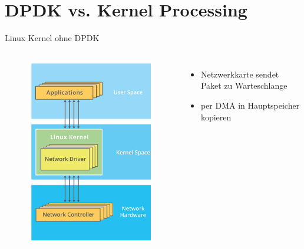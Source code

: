 \documentclass{beamer}
\begin{document}
\section{DPDK vs. Kernel Processing}
\begin{frame}{Linux Kernel ohne DPDK}
    \begin{columns}
        \begin{figure}[h]
            \centering
            \includegraphics[width=\linewidth]{img/kernel_without_dpdk.png}
        \end{figure}
        \begin{itemize}
            \item Netzwerkkarte sendet Paket zu Warteschlange
            \item per DMA in Hauptspeicher kopieren

\end{itemize}
\end{columns}
\end{frame}
\end{document}
